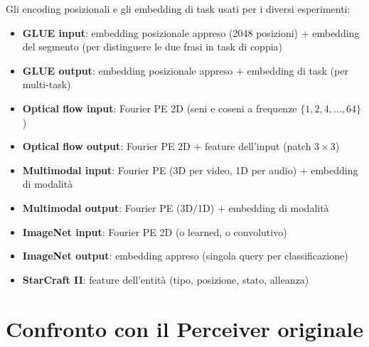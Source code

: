 \documentclass[12pt,a4paper]{article}
\begin{document}
\begin{notabox}
Gli encoding posizionali e gli embedding di task usati per i diversi esperimenti:
\begin{itemize}
    \item \textbf{GLUE input}: embedding posizionale appreso (2048 posizioni) + embedding del segmento (per distinguere le due frasi in task di coppia)
    \item \textbf{GLUE output}: embedding posizionale appreso + embedding di task (per multi-task)
    \item \textbf{Optical flow input}: Fourier PE 2D (seni e coseni a frequenze $\{1, 2, 4, \ldots, 64\}$)
    \item \textbf{Optical flow output}: Fourier PE 2D + feature dell'input (patch $3 \times 3$)
    \item \textbf{Multimodal input}: Fourier PE (3D per video, 1D per audio) + embedding di modalit\`a
    \item \textbf{Multimodal output}: Fourier PE (3D/1D) + embedding di modalit\`a
    \item \textbf{ImageNet input}: Fourier PE 2D (o learned, o convolutivo)
    \item \textbf{ImageNet output}: embedding appreso (singola query per classificazione)
    \item \textbf{StarCraft II}: feature dell'entit\`a (tipo, posizione, stato, alleanza)
\end{itemize}
\end{notabox}


\section{Confronto con il Perceiver originale}
\end{document}
